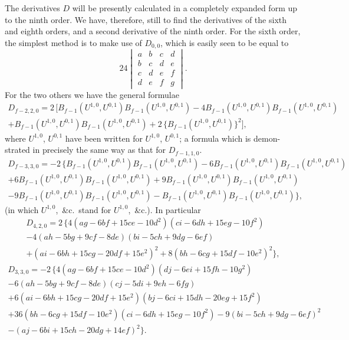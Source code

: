 \documentclass[12pt,a4paper]{article}
\begin{document}
The derivatives $D$ will be presently calculated in a completely expanded form up to
the ninth order. We have, therefore, still to find the derivatives of the sixth and
eighth orders, and a second derivative of the ninth order. For the sixth order, the
simplest method is to make use of $D_{0,0}$, which is easily seen to be equal to
\[
24\begin{vmatrix}
a & b & c & d \\
b & c & d & e \\
c & d & e & f \\
d & e & f & g
\end{vmatrix}.
\]
For the two others we have the general formulae
\begin{multline*}
D_{f-2,2,0} = 2\,[B_{f-1}(U^{1,0}, U^{0,1}) B_{f-1}(U^{1,0}, U^{0,1})
- 4B_{f-1}(U^{1,0}, U^{0,1}) B_{f-1}(U^{1,0}, U^{0,1})\\
+ B_{f-1}(U^{1,0}, U^{0,1}) B_{f-1}(U^{1,0}, U^{0,1})
+ 2\,\{B_{f-1}(U^{1,0}, U^{0,1})\}^2],
\end{multline*}
where $U^{1,0}$, $U^{0,1}$ have been written for $U^{1,0}$, $U^{0,1}$; a formula which is demon-
strated in precisely the same way as that for $D_{f-1,1,0}$.
\begin{multline*}
D_{f-3,3,0} = -2\,\{B_{f-1}(U^{1,0}, U^{0,1}) B_{f-1}(U^{1,0}, U^{0,1})
- 6B_{f-1}(U^{1,0}, U^{0,1}) B_{f-1}(U^{1,0}, U^{0,1})\\
+ 6B_{f-1}(U^{1,0}, U^{0,1}) B_{f-1}(U^{1,0}, U^{0,1})
+ 9B_{f-1}(U^{1,0}, U^{0,1}) B_{f-1}(U^{1,0}, U^{0,1})\\
- 9B_{f-1}(U^{1,0}, U^{0,1}) B_{f-1}(U^{1,0}, U^{0,1})
- B_{f-1}(U^{1,0}, U^{0,1}) B_{f-1}(U^{1,0}, U^{0,1})\},
\end{multline*}
(in which $U^{1,0}$,\ \&c.\ stand for $U^{1,0}$,\ \&c.). In particular
\begin{multline*}
D_{4,2,0} = 2\,\{4(ag - 6bf + 15ce - 10d^2)(ci - 6dh + 15eg - 10f^2)\\
- 4(ah - 5bg + 9cf - 8de)(bi - 5ch + 9dg - 6ef)\\
+ (ai - 6bh + 15cg - 20df + 15e^2)^2
+ 8(bh - 6cg + 15df - 10e^2)^2\},
\end{multline*}
\begin{multline*}
D_{3,3,0} = -2\,\{4(ag - 6bf + 15ce - 10d^2)(dj - 6ei + 15fh - 10g^2)\\
- 6(ah - 5bg + 9cf - 8de)(cj - 5di + 9eh - 6fg)\\
+ 6(ai - 6bh + 15cg - 20df + 15e^2)(bj - 6ci + 15dh - 20eg + 15f^2)\\
+ 36(bh - 6cg + 15df - 10e^2)(ci - 6dh + 15eg - 10f^2)
- 9(bi - 5ch + 9dg - 6ef)^2\\
- (aj - 6bi + 15ch - 20dg + 14ef)^2\}.
\end{multline*}
\end{document}
